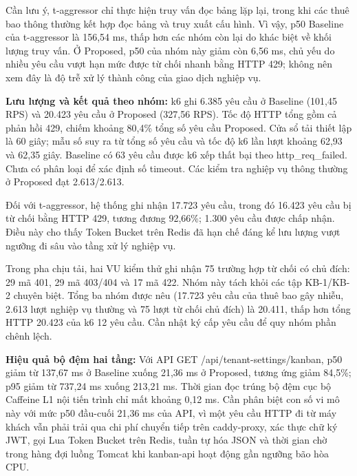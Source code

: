 Cần lưu ý, t-aggressor chỉ thực hiện truy vấn đọc bảng lặp lại, trong khi các thuê bao thông thường kết hợp đọc bảng và truy xuất cấu hình. Vì vậy, p50 Baseline của t-aggressor là 156,54 ms, thấp hơn các nhóm còn lại do khác biệt về khối lượng truy vấn. Ở Proposed, p50 của nhóm này giảm còn 6,56 ms, chủ yếu do nhiều yêu cầu vượt hạn mức được từ chối nhanh bằng HTTP 429; không nên xem đây là độ trễ xử lý thành công của giao dịch nghiệp vụ.

\textbf{Lưu lượng và kết quả theo nhóm:} k6 ghi 6.385 yêu cầu ở Baseline (101,45 RPS) và 20.423 yêu cầu ở Proposed (327,56 RPS). Tốc độ HTTP tổng gồm cả phản hồi 429, chiếm khoảng 80,4\% tổng số yêu cầu Proposed. Cửa sổ tải thiết lập là 60 giây; mẫu số suy ra từ tổng số yêu cầu và tốc độ k6 lần lượt khoảng 62,93 và 62,35 giây. Baseline có 63 yêu cầu được k6 xếp thất bại theo http\_\allowbreak{}req\_\allowbreak{}failed. Chưa có phân loại để xác định số timeout. Các kiểm tra nghiệp vụ thông thường ở Proposed đạt 2.613/2.613.

\begin{landscape}
\renewcommand{\VfourImageMaxHeight}{.72\textheight}
Đối với t-aggressor, hệ thống ghi nhận 17.723 yêu cầu, trong đó 16.423 yêu cầu bị từ chối bằng HTTP 429, tương đương 92,66\%; 1.300 yêu cầu được chấp nhận. Điều này cho thấy Token Bucket trên Redis đã hạn chế đáng kể lưu lượng vượt ngưỡng đi sâu vào tầng xử lý nghiệp vụ.

Trong pha chịu tải, hai VU kiểm thử ghi nhận 75 trường hợp từ chối có chủ đích: 29 mã 401, 29 mã 403/404 và 17 mã 422. Nhóm này tách khỏi các tập KB-1/KB-2 chuyên biệt. Tổng ba nhóm được nêu (17.723 yêu cầu của thuê bao gây nhiễu, 2.613 lượt nghiệp vụ thường và 75 lượt từ chối chủ đích) là 20.411, thấp hơn tổng HTTP 20.423 của k6 12 yêu cầu. Cần nhật ký cấp yêu cầu để quy nhóm phần chênh lệch.
\end{landscape}

\textbf{Hiệu quả bộ đệm hai tầng:} Với API GET /api/tenant-settings/kanban, p50 giảm từ 137,67 ms ở Baseline xuống 21,36 ms ở Proposed, tương ứng giảm 84,5\%; p95 giảm từ 737,24 ms xuống 213,21 ms. Thời gian đọc trúng bộ đệm cục bộ Caffeine L1 nội tiến trình chỉ mất khoảng 0,12 ms. Cần phân biệt con số vi mô này với mức p50 đầu-cuối 21,36 ms của API, vì một yêu cầu HTTP đi từ máy khách vẫn phải trải qua chi phí chuyển tiếp trên caddy-proxy, xác thực chữ ký JWT, gọi Lua Token Bucket trên Redis, tuần tự hóa JSON và thời gian chờ trong hàng đợi luồng Tomcat khi kanban-api hoạt động gần ngưỡng bão hòa CPU.

